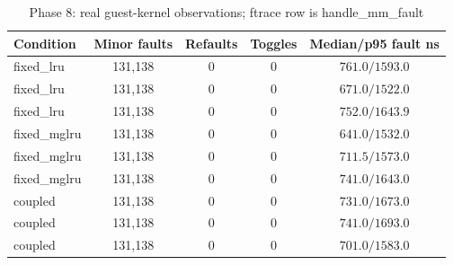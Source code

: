 \begin{table}[t]
\caption{Phase 8: real guest-kernel observations; ftrace row is handle\_mm\_fault}
\label{tab:kernel_main}
\centering\footnotesize
\setlength{\tabcolsep}{2pt}
\begin{tabular}{@{}lcccc@{}}
\toprule
Condition & Minor faults & Refaults & Toggles & Median/p95 fault ns \\
\midrule
fixed\_lru & 131,138 & 0 & 0 & $761.0/1593.0$ \\
fixed\_lru & 131,138 & 0 & 0 & $671.0/1522.0$ \\
fixed\_lru & 131,138 & 0 & 0 & $752.0/1643.9$ \\
fixed\_mglru & 131,138 & 0 & 0 & $641.0/1532.0$ \\
fixed\_mglru & 131,138 & 0 & 0 & $711.5/1573.0$ \\
fixed\_mglru & 131,138 & 0 & 0 & $741.0/1643.0$ \\
coupled & 131,138 & 0 & 0 & $731.0/1673.0$ \\
coupled & 131,138 & 0 & 0 & $741.0/1693.0$ \\
coupled & 131,138 & 0 & 0 & $701.0/1583.0$ \\
\bottomrule
\end{tabular}
\end{table}
